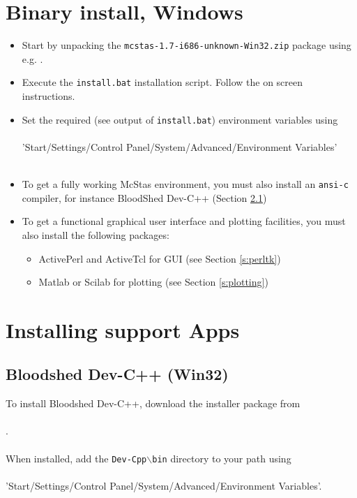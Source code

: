 \section{Binary install, Windows}
\label{s:winbin}
\begin{itemize}
\item{Start by unpacking the \texttt{mcstas-1.7-i686-unknown-Win32.zip} package using
e.g. .}
\item{Execute the \texttt{install.bat} installation script. Follow the
  on screen instructions.}
\item{Set the required (see output of \texttt{install.bat}) environment variables using
\\\ \\
\noindent 'Start/Settings/Control Panel/System/Advanced/Environment
Variables'\\\ \\}
\item{To get a fully working McStas environment, you must also install
    an \texttt{ansi-c} compiler, for instance BloodShed Dev-C++
    (Section \ref{s:instblood})}
\item{To get a functional graphical user
    interface and plotting facilities, you must also install the following
    packages:}
  \begin{itemize}
    \item{ActivePerl and ActiveTcl for GUI (see Section \ref{s:perltk})}
    \item{Matlab or Scilab for plotting (see Section \ref{s:plotting})}
  \end{itemize}
\end{itemize}

\section{Installing support Apps}
\subsection{Bloodshed Dev-C++ (Win32)}
\label{s:instblood}
To install Bloodshed Dev-C++, download the installer package from
\\\
\\.\\\
\\
When installed, add the \texttt{Dev-Cpp$\backslash$bin} directory to your path
using\\\ \\
'Start/Settings/Control Panel/System/Advanced/Environment Variables'.

